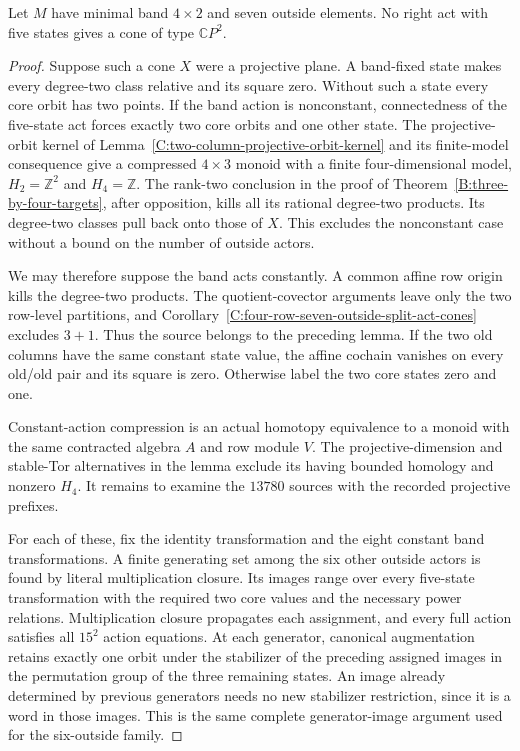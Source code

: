 \begin{theorem}
\label{C:four-row-seven-outside-five-state-cones}
Let $M$ have minimal band $4\times2$ and seven outside elements.
No right act with five states gives a cone of type $\mathbb CP^2$.
\end{theorem}
\begin{proof}
Suppose such a cone $X$ were a projective plane.  A band-fixed
state makes every degree-two class relative and its square zero.
Without such a state every core orbit has two points.  If the
band action is nonconstant, connectedness of the five-state act
forces exactly two core orbits and one other state.  The
projective-orbit kernel of
Lemma~\ref{C:two-column-projective-orbit-kernel} and its finite-model
consequence give a compressed $4\times3$ monoid with a finite
four-dimensional model, $H_2=\mathbb Z^2$ and $H_4=\mathbb Z$.
The rank-two conclusion in the proof of
Theorem~\ref{B:three-by-four-targets}, after opposition, kills all
its rational degree-two products.  Its degree-two classes pull
back onto those of $X$.  This excludes the nonconstant case
without a bound on the number of outside actors.

We may therefore suppose the band acts constantly.
A common affine row origin kills the
degree-two products.  The quotient-covector arguments leave only
the two row-level partitions, and
Corollary~\ref{C:four-row-seven-outside-split-act-cones} excludes
$3+1$.  Thus the source belongs to the preceding lemma.
If the two old columns have the same constant state value, the
affine cochain vanishes on every old/old pair and its square is
zero.  Otherwise label the two core states zero and one.

Constant-action compression is an actual homotopy equivalence
to a monoid with the same contracted algebra $A$ and row module
$V$.  The projective-dimension and stable-Tor alternatives in the
lemma exclude its having bounded homology and nonzero $H_4$.
It remains to examine the $13780$ sources with the recorded
projective prefixes.

For each of these, fix the identity transformation and the eight
constant band transformations.  A finite generating set among
the six other outside actors is found by literal multiplication
closure.  Its images range over every five-state transformation
with the required two core values and the necessary power
relations.  Multiplication closure propagates each assignment,
and every full action satisfies all $15^2$ action equations.
At each generator, canonical augmentation retains exactly one
orbit under the stabilizer of the preceding assigned images in
the permutation group of the three remaining states.  An image
already determined by previous generators needs no new stabilizer
restriction, since it is a word in those images.  This is the
same complete generator-image argument used for the six-outside
family.


\end{proof}
